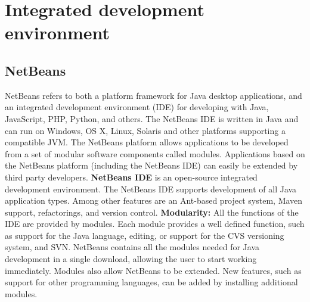 \section{Integrated development environment}

\subsection{NetBeans}
NetBeans refers to both a platform framework for Java desktop applications, and an integrated development environment (IDE) for developing with Java, JavaScript, PHP, Python, and others.
The NetBeans IDE is written in Java and can run on Windows, OS X, Linux, Solaris and other platforms supporting a compatible JVM. 
\newline
\newline
The NetBeans platform allows applications to be developed from a set of modular software components called modules. Applications based on the NetBeans platform (including the NetBeans IDE) can easily be extended by third party developers\cite{bib:netbeans}.
\newline
\newline
\textbf{NetBeans IDE} is an open-source integrated development environment. The NetBeans IDE supports development of all Java application types. Among other features are an Ant-based project system, Maven support, refactorings, and version control\cite{bib:ide}.
\newline
\newline
\textbf{Modularity:} All the functions of the IDE are provided by modules. Each module provides a well defined function, such as support for the Java language, editing, or support for the CVS versioning system, and SVN. NetBeans contains all the modules needed for Java development in a single download, allowing the user to start working immediately. Modules also allow NetBeans to be extended. New features, such as support for other programming languages, can be added by installing additional modules.